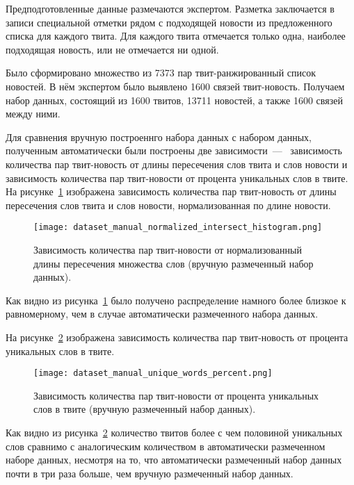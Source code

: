         Предподготовленные данные размечаются экспертом.
        Разметка заключается в записи специальной отметки рядом с подходящей новости из предложенного списка для каждого твита.
        Для каждого твита отмечается только одна, наиболее подходящая новость, или не отмечается ни одной.

        Было сформировано множество из 7373 пар твит-ранжированный список новостей. В нём экспертом было выявлено 1600 связей твит-новость.
        Получаем набор данных, состоящий из 1600 твитов, 13711 новостей, а также 1600 связей между ними.

        Для сравнения вручную построеннго набора данных с набором данных, полученным автоматически были построены две зависимости~---~
        зависимость количества пар твит-новость от длины пересечения слов твита и слов новости и  зависимость количества пар твит-новости от процента уникальных слов в твите.
        На рисунке~\ref{pic:manual_histogram} изображена зависимость количества пар твит-новость от длины пересечения слов твита и слов новости, нормализованная по длине новости.
        \begin{figure}[h!]
            \center
            \texttt{[image: dataset\_manual\_normalized\_intersect\_histogram.png]}
            \caption{Зависимость количества пар твит-новости от нормализованный длины пересечения множества слов (вручную размеченный набор данных).}
            \label{pic:manual_histogram}
        \end{figure}
        Как видно из рисунка~\ref{pic:manual_histogram} было получено распределение намного более близкое к равномерному, чем в случае автоматически размеченного набора данных.

        На рисунке~\ref{pic:manual_percent} изображена зависимость количества пар твит-новость от процента уникальных слов в твите.
        \begin{figure}[h!]
            \center
            \texttt{[image: dataset\_manual\_unique\_words\_percent.png]}
            \caption{Зависимость количества пар твит-новости от процента уникальных слов в твите (вручную размеченный набор данных).}
            \label{pic:manual_percent}
        \end{figure}
        Как видно из рисунка~\ref{pic:manual_percent} количество твитов более с чем половиной уникальных слов сравнимо с аналогическим количеством в автоматически размеченном наборе данных,
        несмотря на то, что автоматически размеченный набор данных почти в три раза больше, чем вручную размеченный набор данных.

